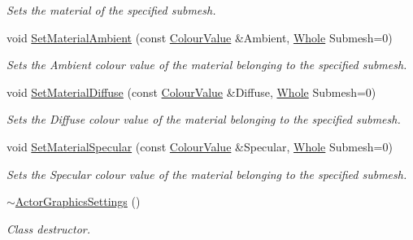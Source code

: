 \begin{DoxyCompactItemize}
\begin{DoxyCompactList}\small\item\em Sets the material of the specified submesh. \item\end{DoxyCompactList}\item 
void \hyperlink{classphys_1_1ActorGraphicsSettings_a93d1c9b229b51b98702b29b8bb5ec4d0}{SetMaterialAmbient} (const \hyperlink{classphys_1_1ColourValue}{ColourValue} \&Ambient, \hyperlink{namespacephys_a460f6bc24c8dd347b05e0366ae34f34a}{Whole} Submesh=0)
\begin{DoxyCompactList}\small\item\em Sets the Ambient colour value of the material belonging to the specified submesh. \item\end{DoxyCompactList}\item 
void \hyperlink{classphys_1_1ActorGraphicsSettings_a135bebcafc6a2386aaec61bce7a5e548}{SetMaterialDiffuse} (const \hyperlink{classphys_1_1ColourValue}{ColourValue} \&Diffuse, \hyperlink{namespacephys_a460f6bc24c8dd347b05e0366ae34f34a}{Whole} Submesh=0)
\begin{DoxyCompactList}\small\item\em Sets the Diffuse colour value of the material belonging to the specified submesh. \item\end{DoxyCompactList}\item 
void \hyperlink{classphys_1_1ActorGraphicsSettings_a51bfae72380679093595c1805b1d940b}{SetMaterialSpecular} (const \hyperlink{classphys_1_1ColourValue}{ColourValue} \&Specular, \hyperlink{namespacephys_a460f6bc24c8dd347b05e0366ae34f34a}{Whole} Submesh=0)
\begin{DoxyCompactList}\small\item\em Sets the Specular colour value of the material belonging to the specified submesh. \item\end{DoxyCompactList}\item 
\hypertarget{classphys_1_1ActorGraphicsSettings_a3c6f9f1dd5bcceda2db65f1514313e14}{
\hyperlink{classphys_1_1ActorGraphicsSettings_a3c6f9f1dd5bcceda2db65f1514313e14}{$\sim$ActorGraphicsSettings} ()}
\label{classphys_1_1ActorGraphicsSettings_a3c6f9f1dd5bcceda2db65f1514313e14}

\begin{DoxyCompactList}\small\item\em Class destructor. \item\end{DoxyCompactList}\end{DoxyCompactItemize}
